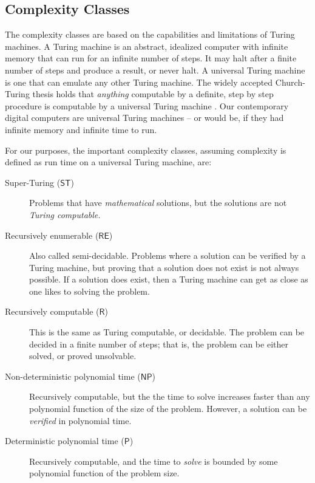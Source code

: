 \documentclass[11pt,papersize=a4]{scrartcl}
\begin{document}
 \subsection*{Complexity Classes} \label{sec:complexity}
 
 The complexity classes are based on the capabilities and limitations of Turing machines. A Turing machine is an abstract, idealized computer with infinite memory that can run for an infinite number of steps. It may halt after a finite number of steps and produce a result, or never halt. A universal Turing machine is one that can emulate any other Turing machine. The widely accepted Church-Turing thesis holds that \emph{anything} computable by a definite, step by step procedure is computable by a universal Turing machine  \parencite{sep-church-turing}. Our contemporary digital computers are universal Turing machines -- or would be, if they had infinite memory and infinite time to run.
 
 For our purposes, the important complexity classes, assuming complexity is defined as run time on a universal Turing machine, are:

\begin{description}
\item[Super-Turing ($\mathsf{ST}$)] Problems that have \emph{mathematical} solutions, but the solutions are not \emph{Turing computable.} 
\item[Recursively enumerable ($\mathsf{RE}$)] Also called semi-decidable. Problems where a solution can be verified by a Turing machine, but proving that a solution does not exist is not always possible. If a solution does exist, then a Turing machine can get as close as one likes to solving the problem.
\item[Recursively computable ($\mathsf{R}$)] This is the same as Turing computable, or decidable. The problem can be decided in a finite number of steps; that is, the problem can be either solved, or proved unsolvable.
\item[Non-deterministic polynomial time ($\mathsf{NP}$)] Recursively computable, but the the time to solve increases faster than any polynomial function of the size of the problem. However, a solution can be \emph{verified} in polynomial time.
\item[Deterministic polynomial  time ($\mathsf{P}$)] Recursively computable, and the time to \emph{solve} is bounded by some polynomial function of the problem size.
\end{description}
\end{document}
